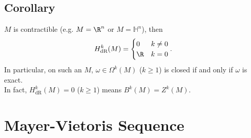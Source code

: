 \documentclass[11pt]{article}
\begin{document}
\subsection*{Corollary}
\label{sec:org5a50b01}
\(M\) is contractible (e.g. \(M=\R^{n}\) or \(M=\mathbb{H}^{n}\)), then\\
\begin{align*}
  H^{k}_{\text{dR}}(M)=
  \begin{cases}
    0 & k\neq0 \\
    \R & k=0
  \end{cases}.
\end{align*}
In particular, on such an \(M\), \(\omega\in\Omega^{k}(M)\) (\(k\geq 1\)) is closed if and only if \(\omega\) is exact.\\
In fact, \(H^{k}_{\text{dR}}(M)=0\) (\(k\geq 1\)) means \(B^{k}(M)=Z^{k}(M)\).\\
\section*{Mayer-Vietoris Sequence}
\label{sec:org8044fa1}
\end{document}
